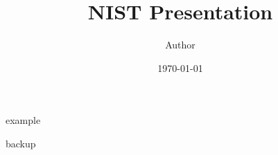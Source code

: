 \documentclass[aspectratio=169]{beamer}
\title{NIST Presentation}
\author[Author]{Author}
\date[\today]{\today}
\begin{document}
  \titleslide

  \overviewslide

  {example}


  \bibliographyslide

  \appendix
  {backup}
\end{document}
